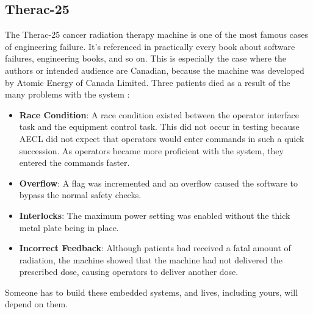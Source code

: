 \subsection*{Therac-25}
The Therac-25 cancer radiation therapy machine is one of the most famous cases of engineering failure. It's referenced in practically every book about software failures, engineering books, and so on. This is especially the case where the authors or intended audience are Canadian, because the machine was developed by Atomic Energy of Canada Limited. Three patients died as a result of the many problems with the system \cite{spos}:

\begin{itemize}
	\item \textbf{Race Condition}: A race condition existed between the operator interface task and the equipment control task. This did not occur in testing because AECL did not expect that operators would enter commands in such a quick succession. As operators became more proficient with the system, they entered the commands faster.
	\item \textbf{Overflow}: A flag was incremented and an overflow caused the software to bypass the normal safety checks.
	\item \textbf{Interlocks}: The maximum power setting was enabled without the thick metal plate being in place.
	\item \textbf{Incorrect Feedback}: Although patients had received a fatal amount of radiation, the machine showed that the machine had not delivered the prescribed dose, causing operators to deliver another dose.
\end{itemize}


Someone has to build these embedded systems, and lives, including yours, will depend on them.




